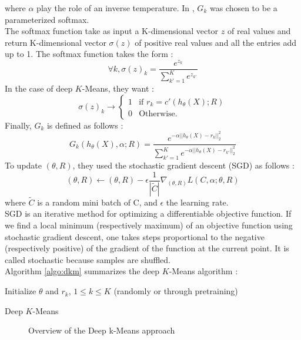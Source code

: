 where $\alpha$ play the role of an inverse temperature. In \cite{Deap-K-Means}
, $G_{k}$ was chosen to be a parameterized softmax.
\\The softmax function take as input a K-dimensional vector $z$ of real values
and return K-dimensional vector $\sigma(z)$ of positive real values and all the 
entries add up to 1. The softmax function takes the form :
\begin{equation}\label{eq:general_softmax}
\forall k, \sigma(z)_k = \frac{e^{z_k}}{\sum_{{k'}=1}^Ke^{z_{k'}}}
\end{equation}
In the case of deep $K$-Means, they want :
\begin{equation}
\sigma(z)_k \rightarrow \left\{
\begin{array}{ll}
  1 & \mbox{if } r_k = c'(h_\theta(X); R)\\
  0 & \mbox{Otherwise.}
\end{array}
\right.
\end{equation}
Finally, $G_{k}$ is defined as follows :
\begin{equation}
G_{k}(h_\theta(X), \alpha; R) = \frac{e^{-\alpha ||h_\theta(X) - r_k||_2^2}}
{\sum\limits_{k' = 1}^K e^{-\alpha ||h_\theta(X) - r_{k'}||_2^2}}
\end{equation}
To update $(\theta, R)$, they used the stochastic gradient descent (SGD)
as follows :
\begin{equation}
  (\theta, R) \gets (\theta, R) - \epsilon \frac{1}{|\widetilde{C}|}
  \nabla_{(\theta, R)} L(C, \alpha; \theta, R)
\end{equation}
where $\widetilde{C}$ is a random mini batch of C, and $\epsilon$ the
learning rate.
\\SGD is an iterative method for optimizing a differentiable objective function.
If we find a local minimum (respectively maximum) of an objective function 
using stochastic gradient descent, one takes steps proportional to the 
negative (respectively positive) of the gradient of the function at the 
current point. It is called stochastic because samples are shuffled.
\\Algorithm \ref{algo:dkm} summarizes the deep $K$-Means algorithm :
\begin{algorithm}[!h]
  Initialize $\theta$ and $r_k$, $1 \leq k \leq K$ (randomly or through 
  pretraining)\\
  \caption{\label{algo:dkm}Deep $K$-Means}
\end{algorithm}
\begin{figure}
  \centering
  \caption{Overview of the Deep k-Means approach}
  \label{fig:approach_dkm}
\end{figure}
